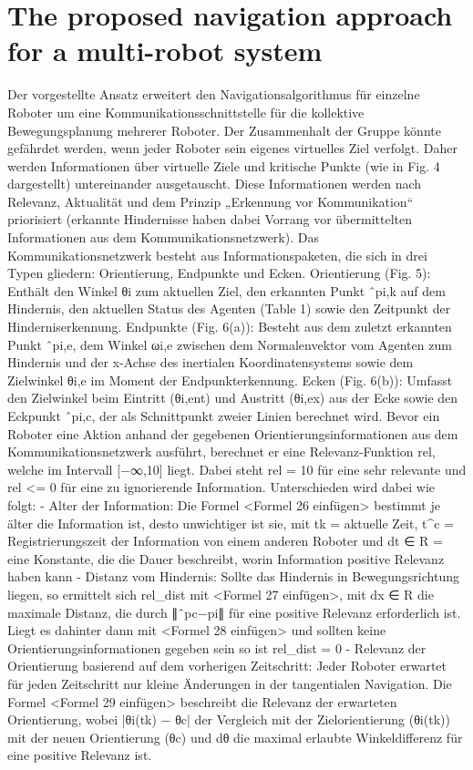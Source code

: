 \documentclass[conference]{IEEEtran}
\begin{document}
\section{The proposed navigation approach for a multi-robot system}
Der vorgestellte Ansatz erweitert den Navigationsalgorithmus für einzelne Roboter um eine Kommunikationsschnittstelle für die kollektive Bewegungsplanung mehrerer Roboter. Der Zusammenhalt der Gruppe könnte gefährdet werden, wenn jeder Roboter sein eigenes virtuelles Ziel verfolgt. Daher werden Informationen über virtuelle Ziele und kritische Punkte (wie in Fig. 4 dargestellt) untereinander ausgetauscht. Diese Informationen werden nach Relevanz, Aktualität und dem Prinzip „Erkennung vor Kommunikation“ priorisiert (erkannte Hindernisse haben dabei Vorrang vor übermittelten Informationen aus dem Kommunikationsnetzwerk).
Das Kommunikationsnetzwerk besteht aus Informationspaketen, die sich in drei Typen gliedern: Orientierung, Endpunkte und Ecken.
Orientierung (Fig. 5): Enthält den Winkel θi zum aktuellen Ziel, den erkannten Punkt ˆpi,k auf dem Hindernis, den aktuellen Status des Agenten (Table 1) sowie den Zeitpunkt der Hinderniserkennung.
Endpunkte (Fig. 6(a)): Besteht aus dem zuletzt erkannten Punkt ˆpi,e, dem Winkel ωi,e zwischen dem Normalenvektor vom Agenten zum Hindernis und der x-Achse des inertialen Koordinatensystems sowie dem Zielwinkel θi,e im Moment der Endpunkterkennung.
Ecken (Fig. 6(b)): Umfasst den Zielwinkel beim Eintritt (θi,ent) und Austritt (θi,ex) aus der Ecke sowie den Eckpunkt ˆpi,c, der als Schnittpunkt zweier Linien berechnet wird.
Bevor ein Roboter eine Aktion anhand der gegebenen Orientierungsinformationen aus dem Kommunikationsnetzwerk ausführt, berechnet er eine Relevanz-Funktion rel, welche im Intervall [−∞,10] liegt. Dabei steht rel = 10 für eine sehr relevante und rel <= 0 für eine zu ignorierende Information. Unterschieden wird dabei wie folgt:
-	Alter der Information: Die Formel <Formel 26 einfügen> bestimmt je älter die Information ist, desto unwichtiger ist sie, mit tk = aktuelle Zeit, t^c = Registrierungszeit der Information von einem anderen Roboter und dt ∈ R = eine Konstante, die die Dauer beschreibt, worin Information positive Relevanz haben kann
-	Distanz vom Hindernis: Sollte das Hindernis in Bewegungsrichtung liegen, so ermittelt sich rel_dist mit <Formel 27 einfügen>, mit dx ∈ R die maximale Distanz, die durch ∥ˆpc−pi∥ für eine positive Relevanz erforderlich ist. Liegt es dahinter dann mit <Formel 28 einfügen> und sollten keine Orientierungsinformationen gegeben sein so ist rel_dist = 0
-	Relevanz der Orientierung basierend auf dem vorherigen Zeitschritt: Jeder Roboter erwartet für jeden Zeitschritt nur kleine Änderungen in der tangentialen Navigation. Die Formel <Formel 29 einfügen> beschreibt die Relevanz der erwarteten Orientierung, wobei |θi(tk) − θc| der Vergleich mit der Zielorientierung (θi(tk)) mit der neuen Orientierung (θc) und dθ die maximal erlaubte Winkeldifferenz für eine positive Relevanz ist.
\end{document}
